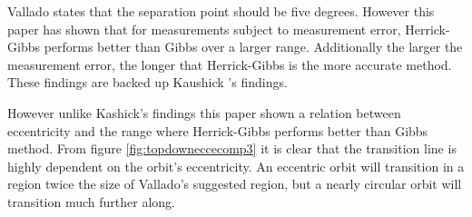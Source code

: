 \documentclass[12pt]{article}
\begin{document}
	Vallado states that \cite{vallado2007fundamentals} the separation point should be five degrees. However this paper has shown that for measurements subject to measurement error, Herrick-Gibbs performs better than Gibbs over a larger range. Additionally the larger the measurement error, the longer that Herrick-Gibbs is the more accurate method. These findings are backed up Kaushick \cite{Kaushick}'s findings.\par 
	However unlike Kashick's findings  this paper shown a relation between eccentricity and the range where Herrick-Gibbs performs better than Gibbs method. From figure \ref{fig:topdowneccecomp3} it is clear that the transition line is highly dependent on the orbit's eccentricity. An eccentric orbit will transition in a region twice the size of  Vallado's suggested region, but a nearly circular orbit will transition much further along.

		
		
		

		
		\newpage
		\singlespacing
\end{document}
